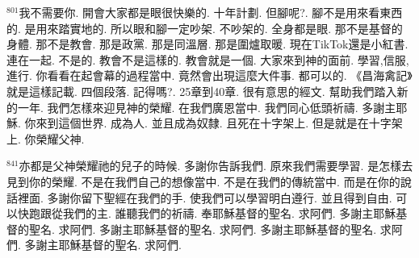 \documentclass{book}
\begin{document}
$^{801}$我不需要你.
開會大家都是眼很快樂的.
十年計劃.
但腳呢?.
腳不是用來看東西的.
是用來踏實地的.
所以眼和腳一定吵架.
不吵架的.
全身都是眼.
那不是基督的身體.
那不是教會.
那是政黨.
那是同溫層.
那是圍爐取暖.
現在TikTok還是小紅書.
連在一起.
不是的.
教會不是這樣的.
教會就是一個.
大家來到神的面前.
學習,信服,進行.
你看看在起會幕的過程當中.
竟然會出現這麼大件事.
都可以的.
《昌海禽記》就是這樣記載.
四個段落.
記得嗎?.
25章到40章.
很有意思的經文.
幫助我們踏入新的一年.
我們怎樣來迎見神的榮耀.
在我們廣恩當中.
我們同心低頭祈禱.
多謝主耶穌.
你來到這個世界.
成為人.
並且成為奴隸.
且死在十字架上.
但是就是在十字架上.
你榮耀父神.

$^{841}$亦都是父神榮耀祂的兒子的時候.
多謝你告訴我們.
原來我們需要學習.
是怎樣去見到你的榮耀.
不是在我們自己的想像當中.
不是在我們的傳統當中.
而是在你的說話裡面.
多謝你留下聖經在我們的手.
使我們可以學習明白遵行.
並且得到自由.
可以快跑跟從我們的主.
誰聽我們的祈禱.
奉耶穌基督的聖名.
求阿們.
多謝主耶穌基督的聖名.
求阿們.
多謝主耶穌基督的聖名.
求阿們.
多謝主耶穌基督的聖名.
求阿們.
多謝主耶穌基督的聖名.
求阿們.
\newpage
\end{document}
